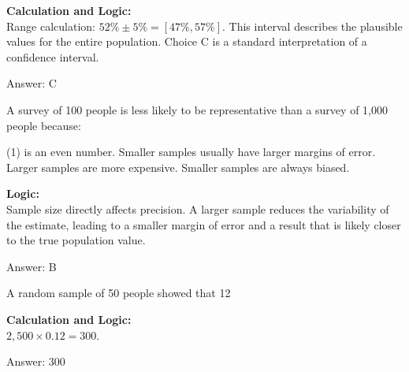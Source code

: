 \documentclass[11pt,paper=a4,answers]{exam}
\begin{document}
\begin{questions}
\begin{solution}
\textbf{Calculation and Logic:} \\
Range calculation: $52\% \pm 5\% = [47\%, 57\%]$. This interval describes the plausible values for the entire population. Choice C is a standard interpretation of a confidence interval.

\vspace{30pt}

Answer: \colorbox{yellow!100}{C}
\end{solution}

\vspace{60pt}

\question
A survey of 100 people is less likely to be representative than a survey of 1,000 people because:
\begin{tasks}(1)
     is an even number.
    \task Smaller samples usually have larger margins of error.
    \task Larger samples are more expensive.
    \task Smaller samples are always biased.
\end{tasks}

\begin{solution}
\textbf{Logic:} \\
Sample size directly affects precision. A larger sample reduces the variability of the estimate, leading to a smaller margin of error and a result that is likely closer to the true population value.

\vspace{30pt}

Answer: \colorbox{yellow!100}{B}
\end{solution}

\vspace{60pt}

\question
A random sample of 50 people showed that 12%

\begin{solution}
\textbf{Calculation and Logic:} \\
$2,500 \times 0.12 = 300$.

\vspace{30pt}

Answer: \colorbox{yellow!100}{300}
\end{solution}

\vspace{60pt}


\end{questions}
\end{document}
